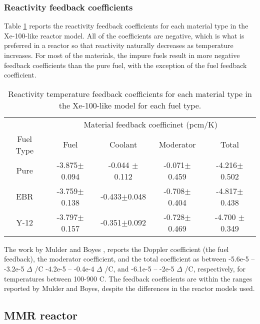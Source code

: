 \subsubsection{Reactivity feedback coefficients}
Table \ref{tab:coeff_xe100} reports the reactivity feedback 
coefficients for each material type in the Xe-100-like reactor model. 
All of the coefficients are negative, which is what is preferred in 
a reactor so that reactivity naturally decreases as temperature increases. 
For most of the materials, the impure fuels result in more negative 
feedback coefficients than the pure fuel, with the exception of the fuel 
feedback coefficient. 


\begin{table}
        \centering
        \caption{Reactivity temperature feedback coefficients for 
        each material type in the Xe-100-like model for each fuel 
        type.}
        \label{tab:coeff_xe100}
        \begin{tabular}{c c c c c}
            \hline 
            & \multicolumn{4}{c}{Material feedback coefficinet (pcm/K)} \\
            Fuel Type & Fuel & Coolant & Moderator & Total \\
            \hline
            Pure & -3.875$\pm$0.094 & -0.044 $\pm$ 0.112 & -0.071$\pm$0.459 & -4.216$\pm$0.502\\
            \gls{EBR} & -3.759$\pm$0.138 & -0.433$\pm$0.048 & -0.708$\pm$0.404 & -4.817$\pm$0.438\\
            Y-12 & -3.797$\pm$0.157 & -0.351$\pm$0.092 & -0.728$\pm$0.469 & -4.700 $\pm$0.349\\
            \hline

        \end{tabular}
\end{table}
The work by Mulder and Boyes \cite{mulder_neutronics_2020}, reports 
the Doppler coefficient (the fuel feedback), the moderator coefficient, 
and the total coefficient as between -5.6e-5 -- -3.2e-5 $\Delta$ 
\keff/\textdegree C
-4.2e-5 -- -0.4e-4 $\Delta$ \keff/\textdegree C, and -6.1e-5 -- -2e-5 
$\Delta$ \keff/\textdegree C, respectively, for temperatures between 100-900
\textdegree C. The feedback coefficients are within the ranges reported 
by Mulder and Boyes, despite the differences in the reactor models used. 

\subsection{MMR reactor}


